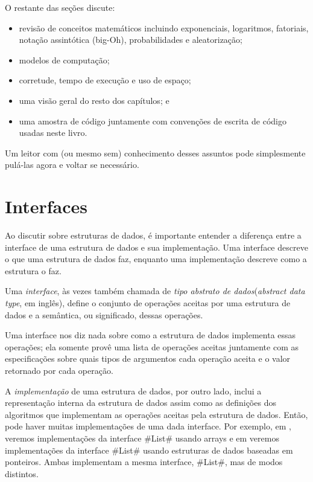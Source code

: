 O restante das seções discute:

\begin{itemize}
  \item revisão de conceitos matemáticos incluindo exponenciais, logaritmos, fatoriais, notação assintótica (big-Oh), probabilidades e aleatorização;
  \item modelos de computação;
  \item corretude, tempo de execução e uso de espaço;
  \item uma visão geral do resto dos capítulos; e 
  \item uma amostra de código juntamente com convenções de escrita de código usadas neste livro.
\end{itemize}

Um leitor com (ou mesmo sem) conhecimento desses assuntos pode simplesmente pulá-las agora e voltar se necessário.

\section{Interfaces}
Ao discutir sobre estruturas de dados, é importante entender a diferença entre a interface de uma estrutura de dados e sua implementação. 
Uma interface descreve o que uma estrutura de dados faz, enquanto uma implementação descreve como a estrutura o faz.

Uma \emph{interface},
%
%
às vezes também chamada de \emph{tipo abstrato de dados}(\emph{abstract data type}, em inglês),
define o conjunto de operações aceitas por uma estrutura de dados e a semântica, ou significado, dessas operações.

Uma interface nos diz nada sobre como a estrutura de dados implementa essas operações; ela somente provê uma lista de operações aceitas juntamente com as especificações sobre quais tipos de argumentos cada operação aceita e o valor retornado por cada operação.

A \emph{implementação} de uma estrutura de dados, por outro lado, inclui a representação interna da estrutura de dados assim como as definições dos algoritmos que implementam as operações aceitas pela estrutura de dados. 
Então, pode haver muitas implementações de uma dada interface.
Por exemplo, em , veremos implementações da interface #List# usando arrays e em  veremos implementações da interface #List# usando estruturas de dados baseadas em ponteiros. Ambas implementam a mesma interface, #List#, mas de modos distintos.

